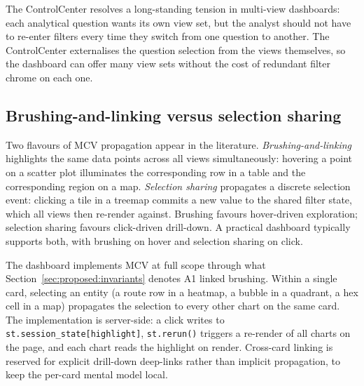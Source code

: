 The ControlCenter resolves a long-standing tension in
multi-view dashboards: each analytical question wants its
own view set, but the analyst should not have to re-enter
filters every time they switch from one question to another.
The ControlCenter externalises the question selection from
the views themselves, so the dashboard can offer many
view sets without the cost of redundant filter chrome on each
one.

\subsection{Brushing-and-linking versus selection sharing}

Two flavours of MCV propagation appear in the literature.
\emph{Brushing-and-linking} highlights the same data points
across all views simultaneously: hovering a point on a scatter
plot illuminates the corresponding row in a table and the
corresponding region on a map. \emph{Selection sharing}
propagates a discrete selection event: clicking a tile in a
treemap commits a new value to the shared filter state, which
all views then re-render against. Brushing favours hover-driven
exploration; selection sharing favours click-driven drill-down.
A practical dashboard typically supports both, with brushing
on hover and selection sharing on click.

The dashboard implements MCV at full scope through what
Section~\ref{sec:proposed:invariants} denotes A1 linked brushing.
Within a single card, selecting an entity (a route row in a
heatmap, a bubble in a quadrant, a hex cell in a map) propagates
the selection to every other chart on the same card. The
implementation is server-side: a click writes to
\texttt{st.session\_state[\textquotesingle highlight\textquotesingle]},
\texttt{st.rerun()} triggers a re-render of all charts on the
page, and each chart reads the highlight on render. Cross-card
linking is reserved for explicit drill-down deep-links rather
than implicit propagation, to keep the per-card mental model
local.
